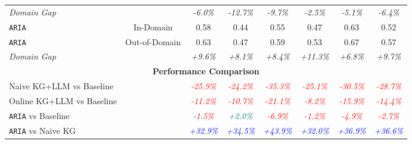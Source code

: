 \begin{table}[ht!]
{\begin{tabular}{lccccccc}
\textit{Domain Gap} & & \textit{-6.0\%} & \textit{-12.7\%} & \textit{-9.7\%} & \textit{-2.5\%} & \textit{-5.1\%} & \textit{-6.4\%} \\
\cmidrule{1-8}
\texttt{ARIA} & In-Domain & 0.58 & 0.44 & 0.55 & 0.47 & 0.63 & 0.52 \\
\texttt{ARIA} & Out-of-Domain & 0.63 & 0.47 & 0.59 & 0.53 & 0.67 & 0.57 \\
\textit{Domain Gap} & & \textit{+9.6\%} & \textit{+8.1\%} & \textit{+8.4\%} & \textit{+11.3\%} & \textit{+6.8\%} & \textit{+9.7\%} \\
\midrule
\multicolumn{8}{c}{\textbf{Performance Comparison}} \\
\midrule
Naive KG+LLM vs Baseline & & \textcolor{red}{\textit{-25.9\%}} & \textcolor{red}{\textit{-24.2\%}} & \textcolor{red}{\textit{-35.3\%}} & \textcolor{red}{\textit{-25.1\%}} & \textcolor{red}{\textit{-30.5\%}} & \textcolor{red}{\textit{-28.7\%}} \\
Online KG+LLM vs Baseline & & \textcolor{red}{\textit{-11.2\%}} & \textcolor{red}{\textit{-10.7\%}} & \textcolor{red}{\textit{-21.1\%}} & \textcolor{red}{\textit{-8.2\%}} & \textcolor{red}{\textit{-15.9\%}} & \textcolor{red}{\textit{-14.4\%}} \\
\texttt{ARIA} vs Baseline & & \textcolor{red}{\textit{-1.5\%}} & \textcolor{teal}{\textit{+2.0\%}} & \textcolor{red}{\textit{-6.9\%}} & \textcolor{red}{\textit{-1.2\%}} & \textcolor{red}{\textit{-4.9\%}} & \textcolor{red}{\textit{-2.7\%}} \\
\texttt{ARIA} vs Naive KG & & \textcolor{blue}{\textit{+32.9\%}} & \textcolor{blue}{\textit{+34.5\%}} & \textcolor{blue}{\textit{+43.9\%}} & \textcolor{blue}{\textit{+32.0\%}} & \textcolor{blue}{\textit{+36.9\%}} & \textcolor{blue}{\textit{+36.6\%}} \\
\bottomrule
\end{tabular}}
\end{table}